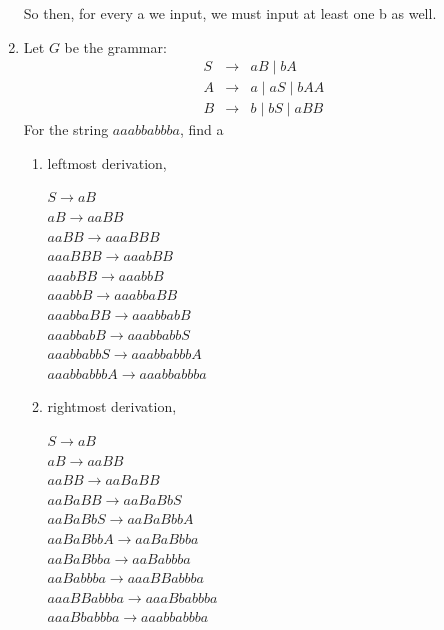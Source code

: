 \documentclass{article}
\begin{document}
\begin{enumerate}
So then, for every a we input, we must input at least one b as well. 

\item Let $G$ be the grammar:
\begin{eqnarray*}
S &\rightarrow& aB \mid bA \\
A &\rightarrow& a \mid aS \mid bAA \\
B &\rightarrow& b \mid bS \mid aBB
\end{eqnarray*}
For the string $aaabbabbba$, find a

\begin{enumerate}
\item leftmost derivation,

$S \rightarrow aB$ \\
$aB \rightarrow aaBB$ \\
$aaBB \rightarrow aaaBBB$ \\
$aaaBBB \rightarrow aaabBB$ \\
$aaabBB \rightarrow  aaabbB$ \\
$aaabbB \rightarrow aaabbaBB$ \\
$aaabbaBB \rightarrow  aaabbabB$ \\
$aaabbabB \rightarrow  aaabbabbS$ \\
$aaabbabbS \rightarrow  aaabbabbbA$ \\
$aaabbabbbA \rightarrow  aaabbabbba$ \\

\item rightmost derivation,

$S \rightarrow aB$ \\
$aB \rightarrow aaBB$ \\
$aaBB \rightarrow aaBaBB$ \\
$aaBaBB \rightarrow aaBaBbS$ \\
$aaBaBbS \rightarrow aaBaBbbA$ \\
$aaBaBbbA \rightarrow aaBaBbba$ \\
$aaBaBbba \rightarrow aaBabbba$ \\
$aaBabbba \rightarrow aaaBBabbba$ \\
$aaaBBabbba \rightarrow aaaBbabbba$ \\
$aaaBbabbba \rightarrow aaabbabbba$ \\


\end{enumerate}
\end{enumerate}
\end{document}
